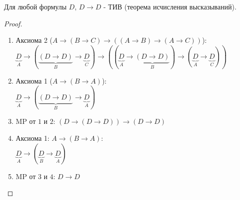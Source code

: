 \begin{lemma} \label{logic_ID} \thmslashn

    Для любой формулы $D$, $D \to D$ - ТИВ (теорема исчисления высказываний).
    
    \begin{proof} \thmslashn
    
        \begin{enumerate}
            \item Аксиома 2 ($A \to (B \to C) \to ((A \to B) \to (A \to C))$):\\ $\underbrace{D}_{A} \to (\underbrace{(D \to D)}_B \to \underbrace{D}_C) \to ((\underbrace{D}_A \to \underbrace{(D \to D)}_B) \to (\underbrace{D}_A \to \underbrace{D}_C))$
            \item Аксиома 1 ($A \to (B \to A)$):\\
                $\underbrace{D}_A \to (\underbrace{(D \to D)}_B \to \underbrace{D}_A)$
            \item MP от $1$ и $2$: $(D \to (D \to D)) \to (D \to D)$
            \item Аксиома 1: $A \to (B \to A)$:\\
                $\underbrace{D}_{A} \to (\underbrace{D}_{B} \to \underbrace{D}_{A} )$
            \item MP от $3$ и $4$: $D \to D$ \qedhere
        \end{enumerate}
    \end{proof}
\end{lemma}


